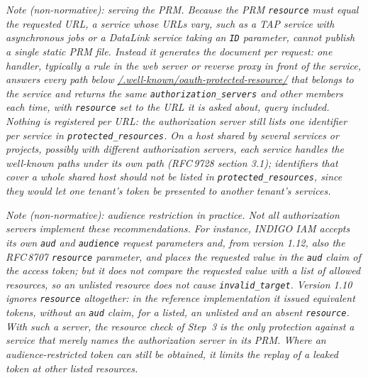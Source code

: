 \documentclass[11pt,a4paper]{ivoa}
\newcommand{\rfc}[1]{RFC\,#1}
\begin{document}
{\itshape Note (non-normative): serving the PRM.
Because the PRM {\tt resource} must equal the requested URL, a service whose
URLs vary, such as a TAP service with asynchronous jobs or a DataLink service
taking an {\tt ID} parameter, cannot publish a single static PRM file.
Instead it generates the document per request: one handler, typically a rule
in the web server or reverse proxy in front of the service, answers every
path below \url{/.well-known/oauth-protected-resource/} that belongs to the
service and
returns the same {\tt authorization\_servers} and other members each time,
with {\tt resource} set to the URL it is asked about, query included. Nothing
is registered per URL: the authorization server still lists one identifier
per service in {\tt protected\_resources}. On a host shared by several
services or projects, possibly with different authorization servers, each
service handles the well-known paths under its own path (\rfc{9728} section
3.1); identifiers that cover a whole shared host should not be listed in
{\tt protected\_resources}, since they would let one tenant's token be
presented to another tenant's services.}

{\itshape Note (non-normative): audience restriction in practice.
Not all authorization servers implement these recommendations. For instance,
INDIGO IAM accepts its own {\tt aud} and {\tt audience} request parameters
and, from version 1.12, also the \rfc{8707} {\tt resource} parameter, and
places the requested value in the {\tt aud} claim of the access token; but it
does not compare the requested value with a list of allowed resources, so an
unlisted resource does not cause {\tt invalid\_target}. Version 1.10 ignores
{\tt resource} altogether: in the reference implementation
\citep{authvo-clients} it issued equivalent tokens, without an {\tt aud}
claim, for a listed, an unlisted and an absent {\tt resource}. With such a
server, the resource check of Step~3 is the only protection against a service
that merely names the authorization server in its PRM. Where an
audience-restricted token can still be obtained, it limits the replay of a
leaked token at other listed resources.}
\end{document}
